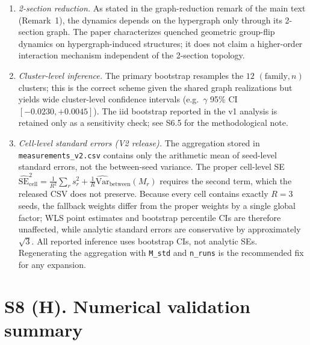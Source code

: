 \documentclass[preprint,12pt]{elsarticle}
\begin{document}
\begin{enumerate}
\item \emph{2-section reduction.} As stated in
the graph-reduction remark of the main text (Remark~1), the dynamics
depends on the hypergraph only through its 2-section graph. The paper
characterizes quenched geometric group-flip dynamics on
hypergraph-induced structures; it does not claim a higher-order
interaction mechanism independent of the 2-section topology.
\item \emph{Cluster-level inference.} The primary bootstrap resamples
the \(12\) \((\text{family},n)\) clusters; this is the correct scheme
given the shared graph realizations but yields wide cluster-level
confidence intervals (e.g.\ \(\gamma\) 95\% CI
\([-0.0230,+0.0045]\)). The iid bootstrap reported in the v1 analysis
is retained only as a sensitivity check; see S6.5 for the
methodological note.
\item \emph{Cell-level standard errors (V2 release).} The aggregation
stored in \texttt{measurements\_v2.csv} contains only the arithmetic
mean of seed-level standard errors, not the between-seed variance. The
proper cell-level SE
\(\widehat{\mathrm{SE}}_{\mathrm{cell}}^2
= \frac{1}{R^2}\sum_r s_r^2 + \frac{1}{R}\widehat{\mathrm{Var}}_{\mathrm{between}}(M_r)\)
requires the second term, which the released CSV does not preserve.
Because every cell contains exactly \(R=3\) seeds, the fallback weights
differ from the proper weights by a single global factor; WLS point
estimates and bootstrap percentile CIs are therefore unaffected, while
analytic standard errors are conservative by approximately
\(\sqrt{3}\). All reported inference uses bootstrap CIs, not analytic
SEs. Regenerating the aggregation with \texttt{M\_std} and
\texttt{n\_runs} is the recommended fix for any expansion.
\end{enumerate}

\section{S8 (H). Numerical validation summary}
\label{sec:H}
\end{document}
